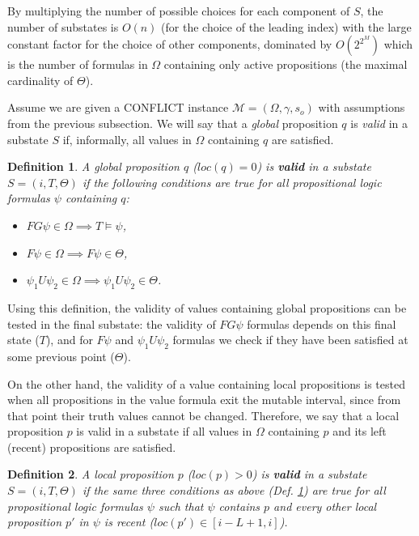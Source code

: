 \documentclass[a4paper,fleqn]{cas-dc}
\newtheorem{Definition}{Definition}
\begin{document}
By multiplying the number of possible choices for each component of $S$, 
the number of substates is $O(n)$ (for the choice of the leading index) with the large constant factor for the choice of other components, dominated by $O(2^{2^M})$ which is the number of formulas in $\Omega$ containing only active propositions
(the maximal cardinality of $\Theta$).

Assume we are given a CONFLICT instance $\mathcal{M}=(\Omega, \gamma, s_o)$ with assumptions from the previous subsection.  We will say that a {\it global} proposition $q$ is {\it valid} in a substate $S$ if, informally,
all values in $\Omega$ containing $q$ are satisfied. 

\begin{Definition}\label{gval}
A global proposition $q$ ($loc(q)=0$) is {\bf valid} in a substate $S = (i, T, \Theta)$ if the following conditions are true for all propositional logic formulas $\psi$ containing $q$:
\begin{itemize}
    \item $FG\psi\in\Omega\implies T\models \psi$, 
    \item $F\psi\in\Omega\implies F\psi\in \Theta$,
    \item $\psi_1 U \psi_2\in\Omega\implies \psi_1 U \psi_2\in \Theta$.
\end{itemize}
\end{Definition}

Using this definition, the validity of values containing global propositions can be tested in the final substate: the validity of $FG\psi$ formulas depends on this final state ($T$), 
and for $F\psi$ and $\psi_1 U\psi_2$ formulas we check if they have been satisfied at some previous point ($\Theta$).

On the other hand, the validity of a value containing local propositions is tested when all propositions in the value formula exit the mutable interval, since from that point their truth values cannot be changed. 
Therefore, we say that a local proposition $p$ is valid in a substate if all values in $\Omega$ containing $p$ and its left (recent) propositions are satisfied.

\begin{Definition}\label{lval}
    A local proposition $p$ ($loc(p)>0$) is {\bf valid} in a substate $S = (i, T, \Theta)$ if the same three conditions as above (Def. \ref{gval}) are true for all propositional logic formulas $\psi$ such that $\psi$ contains $p$ and every other local proposition $p'$ in $\psi$ is recent ($loc(p')\in [i-L+1, i]$).
\end{Definition}
\end{document}
